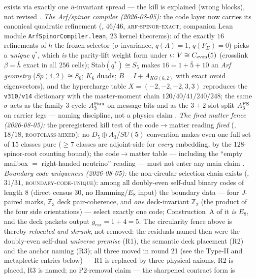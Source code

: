 \documentclass[11pt,a4paper]{article}
\newcommand{\gcar}{g_{\mathrm{car}}}
\newcommand{\Z}{\mathbb{Z}}
\theoremstyle{definition}
\begin{document}
\begin{keybox}
exists via exactly one $\bar u$-invariant spread --- the kill is
explained (wrong blocks), not revised \mE.
\emph{The Arf/spinor compiler (2026-08-05):} the code layer now
carries its canonical quadratic refinement
(, $46/46$,
\textsc{arf-spinor-exact}; companion Lean module
\texttt{ArfSpinorCompiler.lean}, $23$ kernel theorems): of the
exactly $16$ refinements of $\bar h$ the frozen selector
($\sigma$-invariance, $q(A){=}1$, $q(F_\Sigma){=}0$) picks a
\emph{unique} $q^{*}$, which \emph{is} the parity-lift weight form
under $\iota\colon V\cong C_{\rm even}(5)$ (crosslink
$\beta=\bar h$ exact in all $256$ cells); $\mathrm{Stab}(q^{*})\cong
S_5$ makes $16=1+\bar 5+10$ an \emph{Arf geometry}
($Sp(4,2)\cong S_6$; $K_6$ duads; $B=I+A_{KG(6,2)}$ with exact
ovoid eigenvectors), and the hypercharge table
$X=(-2,-2,-2,3,3)$ reproduces the \texttt{v310}/\texttt{v14}
dictionary with the master-moment chain $120/40/41/240/248$;
the same $\sigma$ acts as the family 3-cycle $A_3^{\rm Fam}$ on
message bits and as the $3{+}2$ slot split $A_3^{\rm PS}$ on
carrier legs --- naming discipline, not a physics claim \mE.
\emph{The fired matter fence (2026-08-05):} the preregistered
kill test of the code$\to$matter reading \emph{fired}
(, $18/18$,
\textsc{rootclass-mixed}): no $D_5{\oplus}A_3$/$SU(5)$ convention
makes even one full set of $15$ classes pure ($\ge7$ classes are
adjoint-side for \emph{every} embedding, by the $128$-spinor-root
counting bound); the code$\to$matter table --- including the
``empty mailbox $=$ right-handed neutrino'' reading --- must not
enter any main claim \mE.
\emph{Boundary code uniqueness (2026-08-05):} the non-circular
selection chain exists
(, $31/31$,
\textsc{boundary-code-unique}): among all doubly-even self-dual
binary codes of length $8$ (direct census $30$, no Hamming/$E_8$
input) the boundary data --- four $J$-paired marks, $\Z_3$ deck
pair-coherence, and \emph{one} deck-invariant $\Z_2$ (the product
of the four side orientations) --- select exactly one code;
Construction~A of it \emph{is} $E_8$, and the deck packets output
$\gcar=1+4=5$.  The circularity fence above is thereby
\emph{relocated and shrunk}, not removed: the residuals named then
were the doubly-even self-dual \emph{universe premise} (R1), the
semantic deck placement (R2) and the anchor naming (R3); all three
moved in round 21 (see the Type-II and metaplectic entries below)
--- R1 is replaced by three physical axioms, R2 is placed, R3 is
named; no P2-removal claim --- the sharpened contract form is

\end{keybox}
\end{document}
